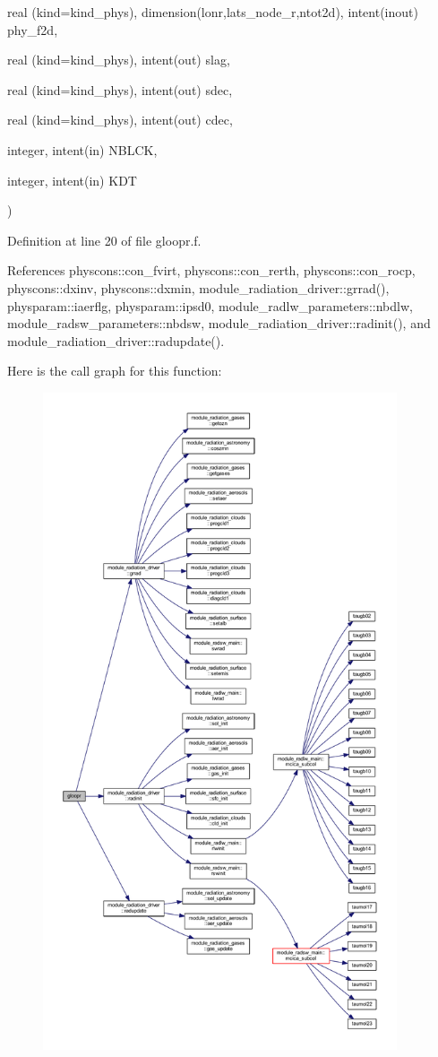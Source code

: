{\begin{DoxyParamCaption}
\item[{real (kind=kind\+\_\+phys), dimension(lonr,lats\+\_\+node\+\_\+r,ntot2d), intent(inout)}]{phy\+\_\+f2d, }
\item[{real (kind=kind\+\_\+phys), intent(out)}]{slag, }
\item[{real (kind=kind\+\_\+phys), intent(out)}]{sdec, }
\item[{real (kind=kind\+\_\+phys), intent(out)}]{cdec, }
\item[{integer, intent(in)}]{N\+B\+L\+CK, }
\item[{integer, intent(in)}]{K\+DT}
\end{DoxyParamCaption}
)}\hypertarget{gloopr_8f_aa4598a23017d824c298984f4b1f14555}{}\label{gloopr_8f_aa4598a23017d824c298984f4b1f14555}


Definition at line 20 of file gloopr.\+f.



References physcons\+::con\+\_\+fvirt, physcons\+::con\+\_\+rerth, physcons\+::con\+\_\+rocp, physcons\+::dxinv, physcons\+::dxmin, module\+\_\+radiation\+\_\+driver\+::grrad(), physparam\+::iaerflg, physparam\+::ipsd0, module\+\_\+radlw\+\_\+parameters\+::nbdlw, module\+\_\+radsw\+\_\+parameters\+::nbdsw, module\+\_\+radiation\+\_\+driver\+::radinit(), and module\+\_\+radiation\+\_\+driver\+::radupdate().



Here is the call graph for this function\+:\nopagebreak
\begin{figure}[H]
\begin{center}
\leavevmode
\includegraphics[height=550pt]{gloopr_8f_aa4598a23017d824c298984f4b1f14555_cgraph}
\end{center}
\end{figure}


